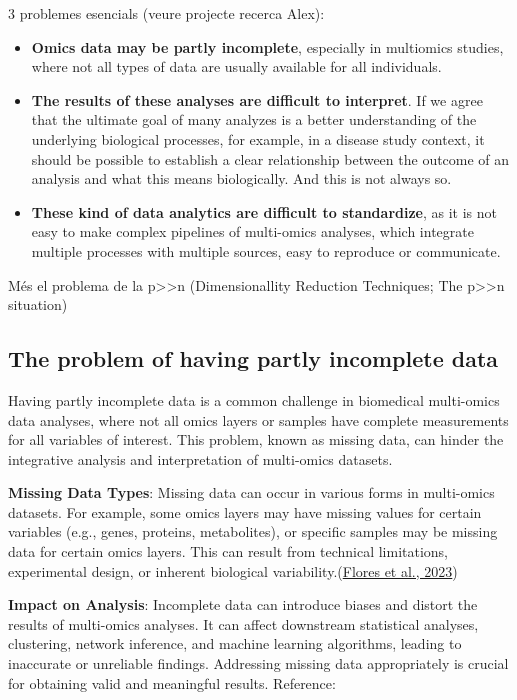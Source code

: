 \documentclass[a4paper, nobind]{templates/ociamthesis}
\begin{document}
3 problemes esencials (veure projecte recerca Alex):

\begin{itemize}
\item
  \textbf{Omics data may be partly incomplete}, especially in multiomics studies, where not all types of data are usually available for all individuals.
\item
  \textbf{The results of these analyses are difficult to interpret}. If we agree that the ultimate goal of many analyzes is a better understanding of the underlying biological processes, for example, in a disease study context, it should be possible to establish a clear relationship between the outcome of an analysis and what this means biologically. And this is not always so.
\item
  \textbf{These kind of data analytics are difficult to standardize}, as it is not easy to make complex pipelines of multi-omics analyses, which integrate multiple processes with multiple sources, easy to reproduce or communicate.
\end{itemize}

Més el problema de la p\textgreater\textgreater n (Dimensionallity Reduction Techniques; The p\textgreater\textgreater n situation)

\hypertarget{the-problem-of-having-partly-incomplete-data}{%
\subsection{The problem of having partly incomplete data}\label{the-problem-of-having-partly-incomplete-data}}

Having partly incomplete data is a common challenge in biomedical multi-omics data analyses, where not all omics layers or samples have complete measurements for all variables of interest. This problem, known as missing data, can hinder the integrative analysis and interpretation of multi-omics datasets.

\textbf{Missing Data Types}: Missing data can occur in various forms in multi-omics datasets. For example, some omics layers may have missing values for certain variables (e.g., genes, proteins, metabolites), or specific samples may be missing data for certain omics layers. This can result from technical limitations, experimental design, or inherent biological variability.(\protect\hyperlink{ref-flores_missing_2023}{Flores et al., 2023})

\textbf{Impact on Analysis}: Incomplete data can introduce biases and distort the results of multi-omics analyses. It can affect downstream statistical analyses, clustering, network inference, and machine learning algorithms, leading to inaccurate or unreliable findings. Addressing missing data appropriately is crucial for obtaining valid and meaningful results. Reference:
\end{document}
